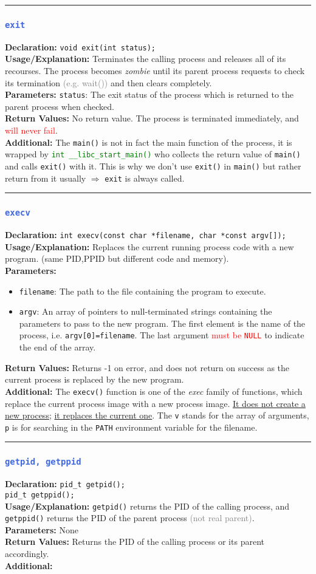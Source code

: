 \documentclass[openany,12pt]{book}
\newcommand{\code}[1]{\texttt{#1}}
\newcommand{\red}[1]{\textcolor{red}{#1}}
\newcommand{\blue}[1]{\textcolor{RoyalBlue}{#1}}
\newcommand{\gray}[1]{\textcolor{gray}{#1}}
\newcommand{\green}[1]{\textcolor{Green}{#1}}
\newcommand{\functionentry}[6]{%
  \noindent\rule{\linewidth}{0.5pt}
  \subsubsection*{\blue{\large{\texttt{#1}}}}
  \textbf{Declaration:} \texttt{#2} \\
  \textbf{Usage/Explanation:} #3 \\
  \textbf{Parameters:} #4 \\
  \textbf{Return Values:} #5 \\
  \textbf{Additional:} #6
  \vspace{1em}
}
\newcommand{\functionentryprams}[6]{%
  \noindent\rule{\linewidth}{0.5pt}
  \subsubsection*{\blue{\large{\texttt{#1}}}}
  \textbf{Declaration:} \texttt{#2} \\
  \textbf{Usage/Explanation:} #3 \\
  \textbf{Parameters:}
  \begin{itemize}[leftmargin=*]
    #4
  \end{itemize}
  \textbf{Return Values:} #5 \\
  \textbf{Additional:} #6
  \vspace{1em}
}
\begin{document}
\functionentry{exit}
{void exit(int status);}
{Terminates the calling process and releases all of its recourses. The process becomes \textit{zombie} until its parent process requests to check its termination \gray{(e.g. wait())} and then clears completely.}
{\code{status}: The exit status of the process which is returned to the parent process when checked.}
{No return value. The process is terminated immediately, and \red{will never fail}.}
{The \code{main()} is not in fact the main function of the process, it is wrapped by \green{\code{int \_\_libc\_start\_main()}} who collects the return value of \code{main()} and calls \code{exit()} with it. This is why we don't use \code{exit()} in \code{main()} but rather return from it usually $\Longrightarrow$ \code{exit} is always called.\label{func:exit}}



\functionentryprams{execv}
{int execv(const char *filename, char *const argv[]);}
{Replaces the current running process code with a new program. (same PID,PPID but different code and memory).}
{\item \code{filename}: The path to the file containing the program to execute.
  \item \code{argv}: An array of pointers to null-terminated strings containing the parameters to pass to the new program. The first element is the name of the process, i.e. \code{argv[0]=filename}. The last argument \red{must be \code{NULL}} to indicate the end of the array.}
{Returns -1 on error, and does not return on success as the current process is replaced by the new program.}
{The \code{execv()} function is one of the \textit{exec} family of functions, which replace the current process image with a new process image. \underline{It does not create a new process;} \underline{it replaces the current one}. The \code{v} stands for the array of arguments, \code{p} is for searching in the \code{PATH} environment variable for the filename. \label{func:execv}}



\functionentry{getpid, getppid}
{pid\_t getpid();\\ pid\_t getppid();}
{\code{getpid()} returns the PID of the calling process, and \code{getppid()} returns the PID of the parent process \gray{(not real parent)}.}
{None}
{Returns the PID of the calling process or its parent accordingly.}
{\label{func:getpid}}
\end{document}
